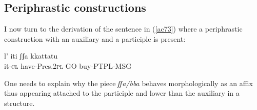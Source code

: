 \documentclass[output=paper]{langscibook}
\begin{document}
\subsection{Periphrastic constructions}

I now turn to the derivation of the sentence in (\ref{ac73}) where a periphrastic construction with an auxiliary and a participle is present:

\ea\label{ac73}
\gll l’    iti         ʃʃa   kkattatu\\
   it-\textsc{cl}  have-Pres.\textsc{2pl}    GO  buy-PTPL-MSG\\
\z

One needs to explain why the piece \textit{ʃʃa/bba} behaves morphologically as an affix thus appearing attached  to the participle and lower than the auxiliary in a structure.
\end{document}
